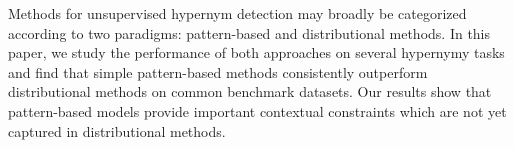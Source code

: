 Methods for unsupervised hypernym detection may broadly be categorized according to two paradigms: pattern-based and distributional methods. In this paper, we study the performance of both approaches on several hypernymy tasks and find that simple pattern-based methods consistently outperform distributional methods on common benchmark datasets. Our results show that pattern-based models provide important contextual constraints which are not yet captured in distributional methods.
